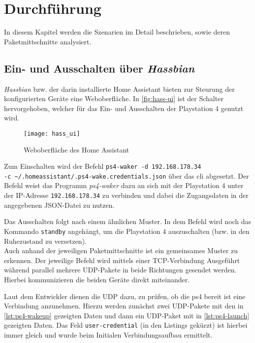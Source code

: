 \newpage
\section{Durchführung}\label{sec:durchfuehrung}
In diesem Kapitel werden die Szenarien im Detail beschrieben, sowie deren Paketmittschnitte analysiert.

\subsection{Ein- und Ausschalten über \textit{Hassbian}}
\textit{Hassbian} bzw. der darin installierte Home Assistant bieten zur Steurung der konfigurierten Geräte eine Weboberfläche.
In \autoref{fig:hass-ui} ist der Schalter hervorgehoben, welcher für das Ein- und Ausschalten der Playstation 4 genutzt wird.

\begin{figure}[h!]
    \centering
    \texttt{[image: hass\_ui]}
    \caption{Weboberfläche des Home Assistant}\label{fig:hass-ui}
\end{figure}


Zum Einschalten wird der Befehl \texttt{ps4-waker -d 192.168.178.34 \\ -c \textasciitilde{}/.homeassistant/.ps4-wake.credentials.json} über das \ac{cli} abgesetzt.
Der Befehl weist das Programm \textit{ps4-waker} dazu an sich mit der Playstation 4 unter der IP-Adresse \texttt{192.168.178.34} zu verbinden und dabei die Zugangsdaten in der angegebenen JSON-Datei zu nutzen.

Das Ausschalten folgt nach einem ähnlichen Muster.
In dem Befehl wird noch das Kommando \texttt{standby} angehängt,
um die Playstation 4 auszuschalten (bzw. in den Ruhezustand zu versetzen). \\

Auch anhand der jeweiligen Paketmittschnitte ist ein gemeinsames Muster zu erkennen.
Der jeweilige Befehl wird mittels einer TCP-Verbindung Ausgeführt
während parallel mehrere UDP-Pakete in beide Richtungen gesendet werden.
Hierbei kommunizieren die beiden Geräte direkt miteinander.

Laut dem Entwickler dienen die UDP dazu, zu prüfen, ob die \ac{ps4} bereit ist eine Verbindung anzunehmen.
Hierzu werden zunächst zwei UDP-Pakete mit den in \autoref{lst:ps4-wakeup} gezeigten Daten
und dann ein UDP-Paket mit in \autoref{lst:ps4-launch} gezeigten Daten.
Das Feld \texttt{user-credential} (in den Listings gekürzt) ist hierbei immer gleich
und wurde beim Initialen Verbindungsaufbau ermittelt.

